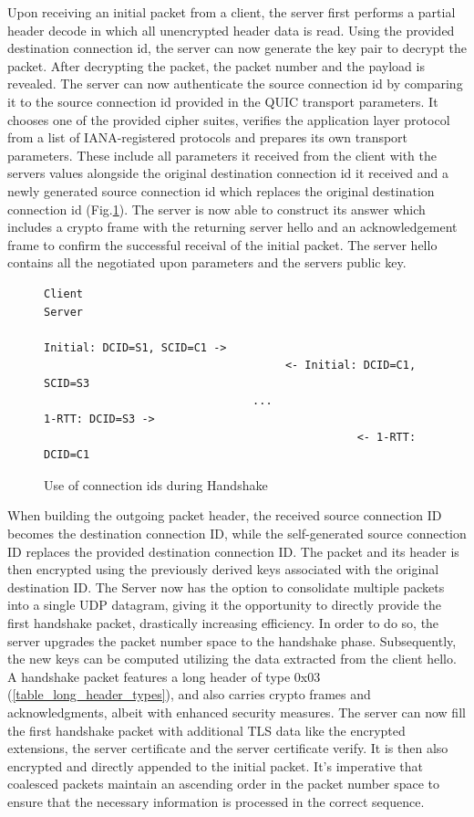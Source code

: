 Upon receiving an initial packet from a client, the server first performs a partial header decode in which all unencrypted header data is read. Using the provided destination connection id, the server can now generate the key pair to decrypt the packet. After decrypting the packet, the packet number and the payload is revealed. The server can now authenticate the source connection id by comparing it to the source connection id provided in the QUIC transport parameters. It chooses one of the provided cipher suites, verifies the application layer protocol from a list of IANA-registered protocols and prepares its own transport parameters. These include all parameters it received from the client with the servers values alongside the original destination connection id it received and a newly generated source connection id which replaces the original destination connection id (Fig.\ref{handshake_cids}). The server is now able to construct its answer which includes a crypto frame with the returning server hello and an acknowledgement frame to confirm the successful receival of the initial packet. The server hello contains all the negotiated upon parameters and the servers public key.

\begin{figure}[htb]
    \centering      
\begin{verbatim}
Client                                                     Server

Initial: DCID=S1, SCID=C1 ->
                                     <- Initial: DCID=C1, SCID=S3
                                ...
1-RTT: DCID=S3 ->
                                                <- 1-RTT: DCID=C1
\end{verbatim}
    \caption{Use of connection ids during Handshake\cite[38]{rfc9000}}
    \label{handshake_cids}
\end{figure}

When building the outgoing packet header, the received source connection ID becomes the destination connection ID, while the self-generated source connection ID replaces the provided destination connection ID. The packet and its header is then encrypted using the previously derived keys associated with the original destination ID. The Server now has the option to consolidate multiple packets into a single UDP datagram, giving it the opportunity to directly provide the first handshake packet, drastically increasing efficiency. In order to do so, the server upgrades the packet number space to the handshake phase. Subsequently, the new keys can be computed utilizing the data extracted from the client hello. A handshake packet features a long header of type 0x03 (\ref{table_long_header_types}), and also carries crypto frames and acknowledgments, albeit with enhanced security measures. The server can now fill the first handshake packet with additional TLS data like the encrypted extensions, the server certificate and the server certificate verify. It is then also encrypted and directly appended to the initial packet. It's imperative that coalesced packets maintain an ascending order in the packet number space to ensure that the necessary information is processed in the correct sequence.

